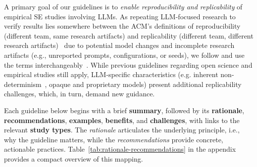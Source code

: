A primary goal of our guidelines is to \emph{enable reproducibility and replicability} of empirical SE studies involving LLMs. As repeating LLM-focused research to verify results lies somewhere between the ACM's definitions of reproducibility (different team, same research artifacts) and replicability (different team, different research artifacts)~\cite{acm2020artifactreview} due to potential model changes and incomplete research artifacts (e.g., unreported prompts, configurations, or seeds), we follow \citeauthor{DBLP:journals/corr/abs-2510-25506} and use the terms interchangeably~\cite{DBLP:journals/corr/abs-2510-25506}. While previous guidelines regarding open science and empirical studies still apply, LLM-specific characteristics (e.g. inherent non-determinism~\cite{DBLP:conf/naacl/SongWLL25, YuanNondeterminismLLMInference}, opaque and proprietary models) present additional replicability challenges, which, in turn, demand new guidance.

Each guideline below begins with a brief \textbf{summary}, followed by its \textbf{rationale}, \textbf{recommendations}, \textbf{examples}, \textbf{benefits}, and \textbf{challenges}, with links to the relevant \textbf{study types}.
The \emph{rationale} articulates the underlying principle, i.e., why the guideline matters, while the \emph{recommendations} provide concrete, actionable practices.
\ifpaper
Table~\ref{tab:rationale-recommendations} in the appendix provides a compact overview of this mapping.
\fi

